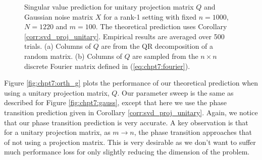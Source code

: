\begin{figure}
  \begin{center}
    \caption{Singular value prediction for unitary projection matrix $Q$ and Gaussian
      noise matrix $X$ for a rank-1 setting with fixed $n=1000$, $N=1220$ and $m=100$. The
      theoretical prediction uses Corollary \ref{corr:svd_proj_unitary}. Empirical results
      are averaged over 500 trials. (a) Columns of $Q$ are from the QR decomposition of a
      random matrix. (b) Columns of $Q$ are sampled from the $n\times
      n$ discrete Fourier matrix defined in (\ref{eq:chpt7:fourier}).}
    \label{fig:chpt7:ortho_sv}
  \end{center}
\end{figure}

Figure \ref{fig:chpt7:orth_g} plots the performance of our theoretical prediction when
using a unitary projection matrix, $Q$. Our parameter sweep is the same as described for
Figure \ref{fig:chpt7:gauss}, except that here we use the phase transition prediction
given in Corollary \ref{corr:svd_proj_unitary}. Again, we notice that our phase transition
prediction is very accurate. A key observation is that for a unitary projection matrix, as
$m\to n$, the phase transition approaches that of not using a projection matrix. This is
very desirable as we don't want to suffer much performance loss for only slightly reducing
the dimension of the problem.

